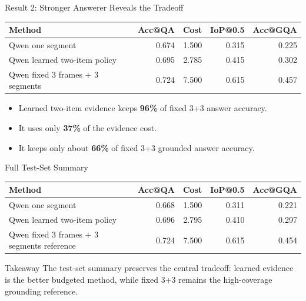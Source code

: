 \documentclass[aspectratio=169]{beamer}
\newcommand{\metric}[1]{\textbf{\color{DeepTeal}#1}}
\newcommand{\smalltab}{\scriptsize}
\begin{document}
\begin{frame}{Result 2: Stronger Answerer Reveals the Tradeoff}
  \begin{table}
    \centering
    \smalltab
    \begin{tabular}{lrrrr}
      \toprule
      Method & Acc@QA & Cost & IoP@0.5 & Acc@GQA \\
      \midrule
      Qwen one segment & 0.674 & 1.500 & 0.315 & 0.225 \\
      Qwen learned two-item policy & 0.695 & 2.785 & 0.415 & 0.302 \\
      Qwen fixed 3 frames + 3 segments & 0.724 & 7.500 & 0.615 & 0.457 \\
      \bottomrule
    \end{tabular}
  \end{table}

  \begin{itemize}
    \item Learned two-item evidence keeps \metric{96\%} of fixed 3+3 answer accuracy.
    \item It uses only \metric{37\%} of the evidence cost.
    \item It keeps only about \metric{66\%} of fixed 3+3 grounded answer accuracy.
  \end{itemize}
\end{frame}

\begin{frame}{Full Test-Set Summary}
  \begin{table}
    \centering
    \scriptsize
    \setlength{\tabcolsep}{3pt}
    \begin{tabular}{lrrrr}
      \toprule
      Method & Acc@QA & Cost & IoP@0.5 & Acc@GQA \\
      \midrule
      Qwen one segment & 0.668 & 1.500 & 0.311 & 0.221 \\
      Qwen learned two-item policy & 0.696 & 2.795 & 0.410 & 0.297 \\
      Qwen fixed 3 frames + 3 segments reference & 0.724 & 7.500 & 0.615 & 0.454 \\
      \bottomrule
    \end{tabular}
  \end{table}

  \begin{block}{Takeaway}
    The test-set summary preserves the central tradeoff: learned evidence is the better budgeted method, while fixed 3+3 remains the high-coverage grounding reference.
  \end{block}
\end{frame}
\end{document}
